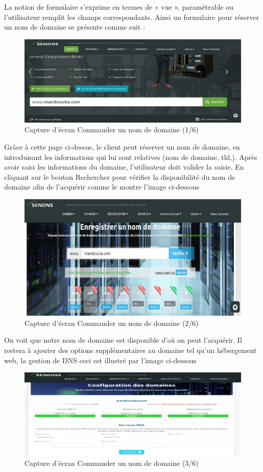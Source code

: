 \documentclass[a4paper, 12pt]{report}
\begin{document}
La notion de formulaire s’exprime en termes de « vue », paramétrable ou l’utilisateur remplit les champs correspondants.
Ainsi un formulaire pour réserver un nom de domaine se présente comme suit :
\begin{figure}[H]
	\centering
	\includegraphics{img/solution/6}
	\caption{Capture d'écran Commander un nom de domaine (1/6)}
	\label{Tux}
\end{figure}
\noindent Grâce à cette page ci-dessus, le client peut réserver un nom de domaine, en introduisant les informations qui lui sont relatives (nom de domaine, tld,). Après avoir saisi les informations du domaine, l’utilisateur doit valider la saisie. En cliquant sur le bouton Rechercher pour vérifier la disponibilité du nom de domaine afin de l’acquérir comme le montre l’image ci-dessous 
\begin{figure}[H]
	\centering
	\includegraphics{img/solution/7}
	\caption{Capture d'écran Commander un nom de domaine (2/6)}
	\label{Tux}
\end{figure}
\noindent On voit que notre nom de domaine est disponible d’où on peut l’acquérir. Il restera à ajouter des options supplémentaires au domaine tel qu’un hébergement web, la gestion de DNS ceci est illustré par l’image ci-dessous
\begin{figure}[H]
	\centering
	\includegraphics{img/solution/8}
	\caption{Capture d'écran Commander un nom de domaine (3/6)}
	\label{Tux}
\end{figure}
\end{document}
